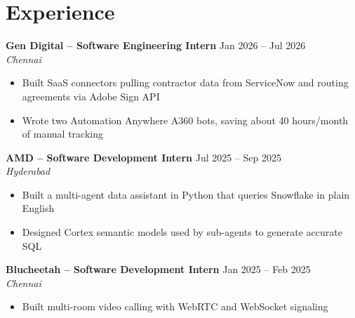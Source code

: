\documentclass[letterpaper,10pt]{article}
\newcommand{\job}[3]{\noindent\textbf{#1} \hfill #3 \\ \textit{#2}}
\newcommand{\resumeItemListStart}{\begin{itemize}[leftmargin=*,itemsep=0pt]}
\newcommand{\resumeItemListEnd}{\end{itemize}}
\newcommand{\resumeItem}[1]{\item #1}
\begin{document}
\section*{Experience}

\job{Gen Digital -- Software Engineering Intern}{Chennai}{Jan 2026 -- Jul 2026}
\resumeItemListStart
  \resumeItem{Built SaaS connectors pulling contractor data from ServiceNow and routing agreements via Adobe Sign API}
  \resumeItem{Wrote two Automation Anywhere A360 bots, saving about 40 hours/month of manual tracking}
\resumeItemListEnd

\job{AMD -- Software Development Intern}{Hyderabad}{Jul 2025 -- Sep 2025}
\resumeItemListStart
  \resumeItem{Built a multi-agent data assistant in Python that queries Snowflake in plain English}
  \resumeItem{Designed Cortex semantic models used by sub-agents to generate accurate SQL}
\resumeItemListEnd

\job{Blucheetah -- Software Development Intern}{Chennai}{Jan 2025 -- Feb 2025}
\resumeItemListStart
  \resumeItem{Built multi-room video calling with WebRTC and WebSocket signaling}
\resumeItemListEnd
\end{document}
